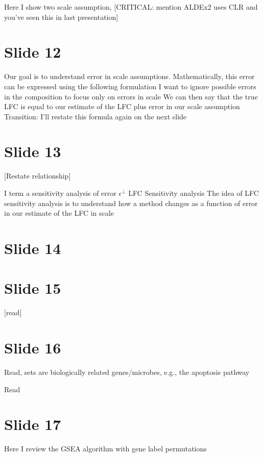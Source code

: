 \documentclass[11pt]{article}
\begin{document}
Here I show two scale assumption, [CRITICAL: mention ALDEx2 uses CLR and you've seen this in last presentation]

\section{Slide 12}
\label{sec:org1c42ff7}

Our goal is to understand error in scale assumptions. Mathematically, this error can be expressed using the following formulation
I want to ignore possible errors in the composition to focus only on errors in scale
We can then say that the true LFC is equal to our estimate of the LFC plus error in our scale assumption
Transition: I'll restate this formula again on the next slide

\section{Slide 13}
\label{sec:org3ca95e7}

[Restate relationship]

I term a sensitivity analysis of error \(\epsilon^\perp\) LFC Sensitivity analysis
The idea of LFC sensitivity analysis is to understand how a method changes as a function of error in our estimate of the LFC in scale

\section{Slide 14}
\label{sec:org49fcd99}

\section{Slide 15}
\label{sec:orgc650424}

[read]

\section{Slide 16}
\label{sec:orgd7a6cb0}

Read, sets are biologically related genes/microbes, e.g., the apoptosis pathway

Read

\section{Slide 17}
\label{sec:org9f6cba2}

Here I review the GSEA algorithm with gene label permutations
\end{document}
